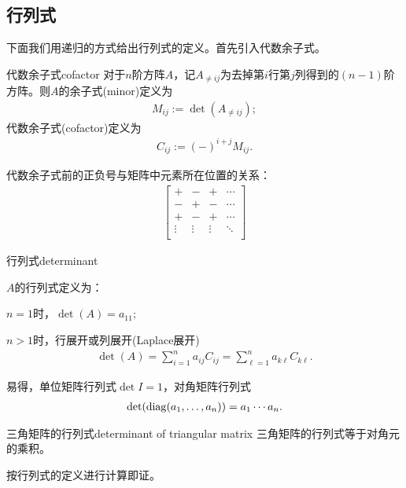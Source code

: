 \subsection{行列式}
下面我们用递归的方式给出行列式的定义。首先引入代数余子式。
\begin{definition}{代数余子式}{cofactor}
	对于$n$阶方阵$A$，记$A_{\neq ij}$为去掉第$i$行第$j$列得到的$(n-1)$阶方阵。则$A$的余子式(minor)定义为
	\begin{align}
		M_{ij}:=\det (A_{\neq ij});
	\end{align}
	代数余子式(cofactor)定义为
	\begin{align}
		C_{ij}:=(-)^{i+j}M_{ij}.
	\end{align}
\end{definition}
代数余子式前的正负号与矩阵中元素所在位置的关系：
\begin{align}
	\begin{bmatrix}
		+&-&+&\cdots\\
		-&+&-&\cdots\\
		+&-&+&\cdots\\
		\vdots&\vdots&\vdots&\ddots\\
	\end{bmatrix}
\end{align}
\begin{definition}{行列式}{determinant}
	
	$A$的行列式定义为：
	\begin{compactenum}
		\item $n=1$时，$\det (A)=a_{11};$
		\item $n>1$时，行展开或列展开(Laplace展开)
		\begin{align}
			\det (A) = \sum_{i=1}^na_{ij}C_{ij} = \sum_{\ell=1}^na_{k\ell}C_{k\ell}.
		\end{align}
	\end{compactenum}
\end{definition}
易得，单位矩阵行列式$\det I=1$，对角矩阵行列式
\begin{align}
	\det(\operatorname{diag}(a_1,\ldots,a_n))=a_1\cdots a_n.
\end{align}
\begin{theorem}{三角矩阵的行列式}{determinant of triangular matrix}
	三角矩阵的行列式等于对角元的乘积。
\end{theorem}
按行列式的定义进行计算即证。
